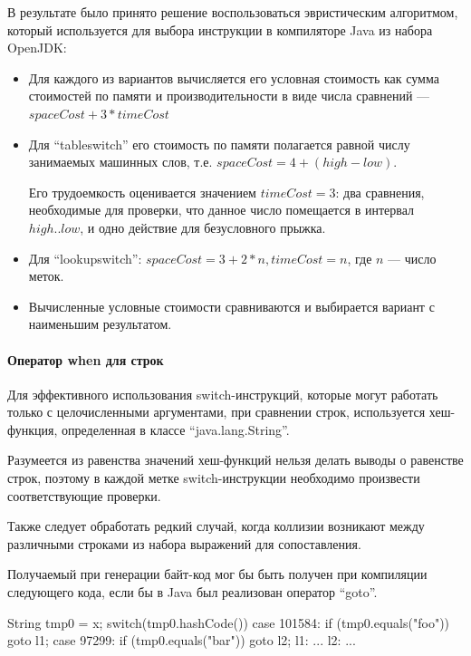 В результате было принято решение воспользоваться эвристическим алгоритмом, который используется
для выбора инструкции в компиляторе Java из набора OpenJDK:
\begin{itemize}
    \item Для каждого из вариантов вычисляется его условная стоимость как сумма стоимостей
    по памяти и производительности в виде числа сравнений --- $spaceCost + 3 * timeCost$

    \item Для ``tableswitch'' его стоимость по памяти полагается равной числу занимаемых машинных
    слов, т.е. $spaceCost = 4 + (high - low)$.

    Его трудоемкость оценивается значением $timeCost = 3$: два сравнения, необходимые для проверки,
    что данное число помещается в интервал $high..low$, и одно действие для безусловного прыжка.

    \item Для ``lookupswitch'': $spaceCost = 3 + 2 * n, timeCost = n$, где $n$ --- число меток.

    \item Вычисленные условные стоимости сравниваются и выбирается вариант с наименьшим
    результатом.
\end{itemize}

\paragraph{Оператор when для строк}
Для эффективного использования switch-инструкций, которые могут работать только с целочисленными
аргументами, при сравнении строк, используется хеш-функция, определенная в классе
``java.lang.String''.

Разумеется из равенства значений хеш-функций нельзя делать выводы о равенстве строк,
поэтому в каждой метке switch-инструкции необходимо произвести соответствующие проверки.

Также следует обработать редкий случай, когда коллизии возникают между различными строками
из набора выражений для сопоставления.

Получаемый при генерации байт-код мог бы быть получен при компиляции следующего кода,
если бы в Java был реализован оператор ``goto''.
\begin{pyglist}[language=java]
String tmp0 = x;
switch(tmp0.hashCode()) {
    case 101584: if (tmp0.equals("foo")) { goto l1; }
    case 97299: if (tmp0.equals("bar")) { goto l2; }
}
l1: ...
l2: ...
\end{pyglist}

